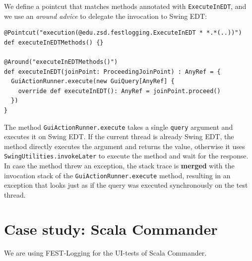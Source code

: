 We define a pointcut that matches methods annotated with \texttt{ExecuteInEDT}, and we use an \emph{around advice} to delegate the invocation to Swing EDT:
\begin{lstlisting}
@Pointcut("execution(@edu.zsd.festlogging.ExecuteInEDT * *.*(..))")
def executeInEDTMethods() {}

@Around("executeInEDTMethods()")
def executeInEDT(joinPoint: ProceedingJoinPoint) : AnyRef = {
  GuiActionRunner.execute(new GuiQuery[AnyRef] {
    override def executeInEDT(): AnyRef = joinPoint.proceed()
  })
}
\end{lstlisting}

The method \texttt{GuiActionRunner.execute} takes a single \texttt{query} argument and executes it on Swing EDT. If the current thread is already Swing EDT, the method directly executes the argument and returns the value, otherwise it uses \texttt{SwingUtilities.invokeLater} to execute the method and wait for the response. In case the method threw an exception, the stack trace is \textbf{merged} with the invocation stack of the \texttt{GuiActionRunner.execute} method, resulting in an exception that looks just as if the query was executed synchronously on the test thread.


\section{Case study: Scala Commander}

We are using FEST-Logging for the UI-tests of Scala Commander. 





